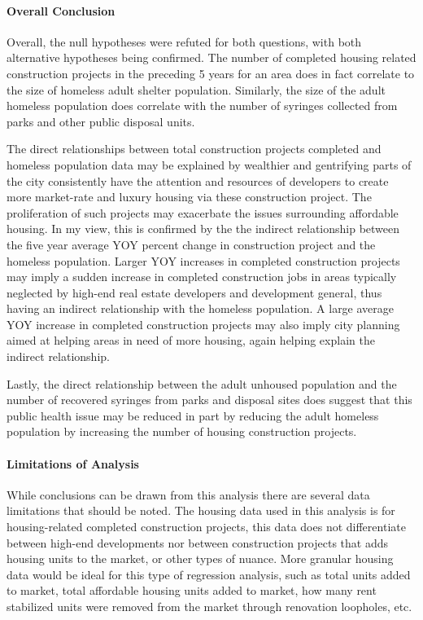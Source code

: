 \documentclass[
]{article}
\begin{document}
\paragraph{Overall Conclusion}\label{overall-conclusion}

Overall, the null hypotheses were refuted for both questions, with both
alternative hypotheses being confirmed. The number of completed housing
related construction projects in the preceding 5 years for an area does
in fact correlate to the size of homeless adult shelter population.
Similarly, the size of the adult homeless population does correlate with
the number of syringes collected from parks and other public disposal
units.

The direct relationships between total construction projects completed
and homeless population data may be explained by wealthier and
gentrifying parts of the city consistently have the attention and
resources of developers to create more market-rate and luxury housing
via these construction project. The proliferation of such projects may
exacerbate the issues surrounding affordable housing. In my view, this
is confirmed by the the indirect relationship between the five year
average YOY percent change in construction project and the homeless
population. Larger YOY increases in completed construction projects may
imply a sudden increase in completed construction jobs in areas
typically neglected by high-end real estate developers and development
general, thus having an indirect relationship with the homeless
population. A large average YOY increase in completed construction
projects may also imply city planning aimed at helping areas in need of
more housing, again helping explain the indirect relationship.

Lastly, the direct relationship between the adult unhoused population
and the number of recovered syringes from parks and disposal sites does
suggest that this public health issue may be reduced in part by reducing
the adult homeless population by increasing the number of housing
construction projects.

\paragraph{Limitations of Analysis}\label{limitations-of-analysis}

While conclusions can be drawn from this analysis there are several data
limitations that should be noted. The housing data used in this analysis
is for housing-related completed construction projects, this data does
not differentiate between high-end developments nor between construction
projects that adds housing units to the market, or other types of
nuance. More granular housing data would be ideal for this type of
regression analysis, such as total units added to market, total
affordable housing units added to market, how many rent stabilized units
were removed from the market through renovation loopholes, etc.
\end{document}
